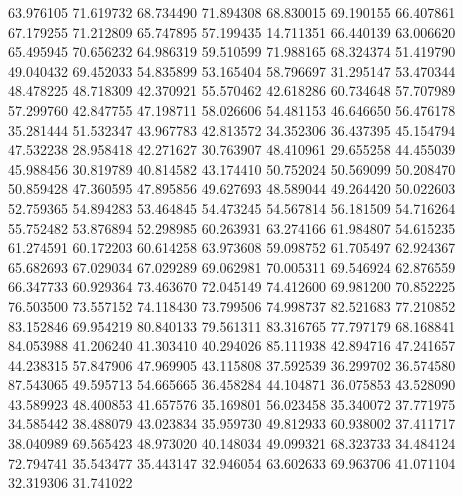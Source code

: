 63.976105
71.619732
68.734490
71.894308
68.830015
69.190155
66.407861
67.179255
71.212809
65.747895
57.199435
14.711351
66.440139
63.006620
65.495945
70.656232
64.986319
59.510599
71.988165
68.324374
51.419790
49.040432
69.452033
54.835899
53.165404
58.796697
31.295147
53.470344
48.478225
48.718309
42.370921
55.570462
42.618286
60.734648
57.707989
57.299760
42.847755
47.198711
58.026606
54.481153
46.646650
56.476178
35.281444
51.532347
43.967783
42.813572
34.352306
36.437395
45.154794
47.532238
28.958418
42.271627
30.763907
48.410961
29.655258
44.455039
45.988456
30.819789
40.814582
43.174410
50.752024
50.569099
50.208470
50.859428
47.360595
47.895856
49.627693
48.589044
49.264420
50.022603
52.759365
54.894283
53.464845
54.473245
54.567814
56.181509
54.716264
55.752482
53.876894
52.298985
60.263931
63.274166
61.984807
54.615235
61.274591
60.172203
60.614258
63.973608
59.098752
61.705497
62.924367
65.682693
67.029034
67.029289
69.062981
70.005311
69.546924
62.876559
66.347733
60.929364
73.463670
72.045149
74.412600
69.981200
70.852225
76.503500
73.557152
74.118430
73.799506
74.998737
82.521683
77.210852
83.152846
69.954219
80.840133
79.561311
83.316765
77.797179
68.168841
84.053988
41.206240
41.303410
40.294026
85.111938
42.894716
47.241657
44.238315
57.847906
47.969905
43.115808
37.592539
36.299702
36.574580
87.543065
49.595713
54.665665
36.458284
44.104871
36.075853
43.528090
43.589923
48.400853
41.657576
35.169801
56.023458
35.340072
37.771975
34.585442
38.488079
43.023834
35.959730
49.812933
60.938002
37.411717
38.040989
69.565423
48.973020
40.148034
49.099321
68.323733
34.484124
72.794741
35.543477
35.443147
32.946054
63.602633
69.963706
41.071104
32.319306
31.741022
